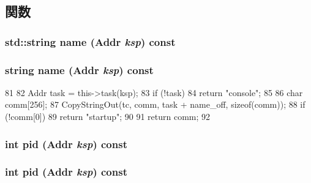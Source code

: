 \subsection{関数}
\hypertarget{classMipsISA_1_1ProcessInfo_a1b2605417c013ef7f6e6416c513f272c}{
\subsubsection[{name}]{\setlength{\rightskip}{0pt plus 5cm}std::string name ({\bf Addr} {\em ksp}) const}}
\label{classMipsISA_1_1ProcessInfo_a1b2605417c013ef7f6e6416c513f272c}
\hypertarget{classMipsISA_1_1ProcessInfo_ae39ec1168c2ea31862bebf2afeda34d8}{
\subsubsection[{name}]{\setlength{\rightskip}{0pt plus 5cm}string name ({\bf Addr} {\em ksp}) const}}
\label{classMipsISA_1_1ProcessInfo_ae39ec1168c2ea31862bebf2afeda34d8}



\begin{DoxyCode}
81 {
82     Addr task = this->task(ksp);
83     if (!task)
84         return "console";
85 
86     char comm[256];
87     CopyStringOut(tc, comm, task + name_off, sizeof(comm));
88     if (!comm[0])
89         return "startup";
90 
91     return comm;
92 }
\end{DoxyCode}
\hypertarget{classMipsISA_1_1ProcessInfo_a27d14b3fdb576a4081e5c58c55375042}{
\subsubsection[{pid}]{\setlength{\rightskip}{0pt plus 5cm}int pid ({\bf Addr} {\em ksp}) const}}
\label{classMipsISA_1_1ProcessInfo_a27d14b3fdb576a4081e5c58c55375042}
\hypertarget{classMipsISA_1_1ProcessInfo_a27d14b3fdb576a4081e5c58c55375042}{
\subsubsection[{pid}]{\setlength{\rightskip}{0pt plus 5cm}int pid ({\bf Addr} {\em ksp}) const}}
\label{classMipsISA_1_1ProcessInfo_a27d14b3fdb576a4081e5c58c55375042}




